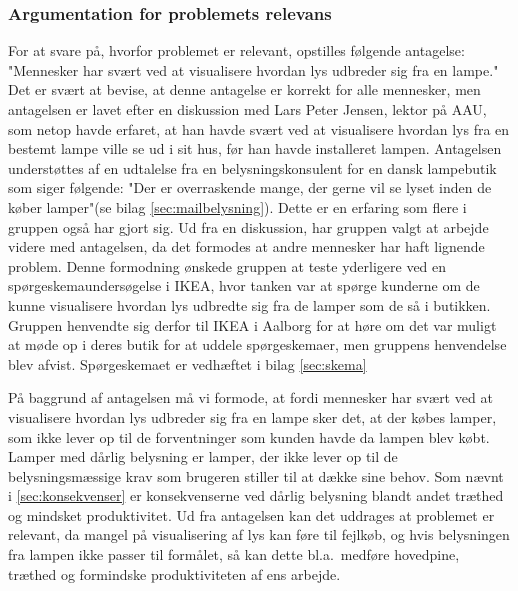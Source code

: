 \subsubsection{Argumentation for problemets relevans}
\label{sec:hvorfor_relavant}
For at svare på, hvorfor problemet er relevant, opstilles følgende antagelse: "Mennesker har svært ved at visualisere hvordan lys udbreder sig fra en lampe." Det er svært at bevise, at denne antagelse er korrekt for alle mennesker, men antagelsen er lavet efter en diskussion med Lars Peter Jensen, lektor på AAU, som netop havde erfaret, at han havde svært ved at visualisere hvordan lys fra en bestemt lampe ville se ud i sit hus, før han havde installeret lampen. Antagelsen understøttes af en udtalelse fra en belysningskonsulent for en dansk lampebutik som siger følgende: "Der er overraskende mange, der gerne vil se lyset inden de køber lamper"(se bilag \ref{sec:mailbelysning}). Dette er en erfaring som flere i gruppen også har gjort sig. Ud fra en diskussion, har gruppen valgt at arbejde videre med antagelsen, da det formodes at andre mennesker har haft lignende problem. Denne formodning ønskede gruppen at teste yderligere ved en spørgeskemaundersøgelse i IKEA, hvor tanken var at spørge kunderne om de kunne visualisere hvordan lys udbredte sig fra de lamper som de så i butikken. Gruppen henvendte sig derfor til IKEA i Aalborg for at høre om det var muligt at møde op i deres butik for at uddele spørgeskemaer, men gruppens henvendelse blev afvist. Spørgeskemaet er vedhæftet i bilag \ref{sec:skema}

På baggrund af antagelsen må vi formode, at fordi mennesker har svært ved at visualisere hvordan lys udbreder sig fra en lampe sker det, at der købes lamper, som ikke lever op til de forventninger som kunden havde da lampen blev købt. Lamper med dårlig belysning er lamper, der ikke lever op til de belysningsmæssige krav som brugeren stiller til at dække sine behov. Som nævnt i \ref{sec:konsekvenser} er konsekvenserne ved dårlig belysning blandt andet træthed og mindsket produktivitet.
Ud fra antagelsen kan det uddrages at problemet er relevant, da mangel på visualisering af lys kan føre til fejlkøb, og hvis belysningen fra lampen ikke passer til formålet, så kan dette bl.a.\ medføre hovedpine, træthed og formindske produktiviteten af ens arbejde.
